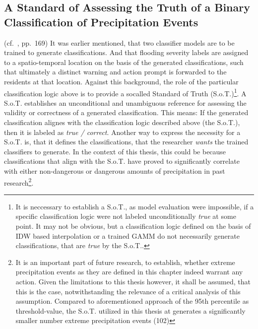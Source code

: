 \documentclass[
  12pt,
]{article}
\begin{document}
\endgroup

\hypertarget{a-standard-of-assessing-the-truth-of-a-binary-classification-of-precipitation-events}{%
\subsection{A Standard of Assessing the Truth of a Binary Classification
of Precipitation
Events}\label{a-standard-of-assessing-the-truth-of-a-binary-classification-of-precipitation-events}}

\begingroup
\justify

(cf.~\cite{Hosmer.2013}, pp.~169) It was earlier mentioned, that two
classifier models are to be trained to generate classifications. And
that flooding severity labels are assigned to a spatio-temporal location
on the basis of the generated classifications, such that ultimately a
distinct warning and action prompt is forwarded to the residents at that
location. Against this background, the role of the particular
classification logic above is to provide a socalled Standard of Truth
(S.o.T.)\footnote{It is neccessary to establish a S.o.T., as model evaluation were impossible, if a specific classification logic were not labeled unconditionally \textit{true} at some point. It may not be obvious, but a classification logic defined on the basis of IDW based interpolation or a trained GAMM do not necessarily generate classifications, that are \textit{true} by the S.o.T..}.
A S.o.T. establishes an unconditional and unambiguous reference for
assessing the validity or correctness of a generated classification.
This means: If the generated classification alignes with the
classification logic described above (the S.o.T.), then it is labeled as
\textit{true / correct}. Another way to express the necessity for a
S.o.T. is, that it defines the classifications, that the researcher
\textit{wants} the trained classifiers to generate. In the context of
this thesis, this could be because classifications that align with the
S.o.T. have proved to significantly correlate with either non-dangerous
or dangerous amounts of precipitation in past
research\footnote{It is an important part of future research, to establish, whether extreme precipitation events as they are defined in this chapter indeed warrant any action. Given the limitations to this thesis however, it shall be assumed, that this is the case, notwithstanding the relevance of a critical analysis of this assumption. Compared to aforementioned approach of the 95th percentile as threshold-value, the S.o.T. utilized in this thesis at generates a significantly smaller number extreme precipitation events (102)}.
\end{document}
